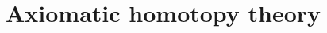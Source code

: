 \documentclass[../main]{subfiles}
\begin{document}
\chapter{Axiomatic homotopy theory}\label{ch:1}
\setcounter{section}{-1}









\end{document}
